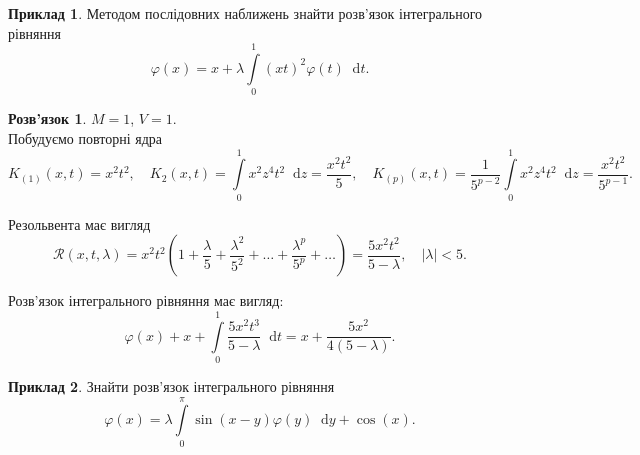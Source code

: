 \documentclass[a4paper, 12pt]{book}
\theoremstyle{definition}
\newtheorem{example}{Приклад}
\newtheorem*{solution*}{Розв'язок}
\newcommand*\diff{\mathop{}\!\mathrm{d}}
\renewcommand{\phi}{\varphi}
\newcommand{\Int}{\displaystyle\int\limits}
\begin{document}
\begin{example}
	Методом послідовних наближень знайти розв’язок інтегрального рівняння \[\phi(x) = x + \lambda \Int_0^1 (xt)^2 \phi(t) \diff t.\]
\end{example}

\begin{solution*}
	$M = 1$, $V = 1$. \\

	Побудуємо повторні ядра \[ K_{(1)}(x, t) = x^2t^2, \quad K_2(x, t) = \Int_0^1 x^2 z^4 t^2 \diff z = \dfrac{x^2t^2}{5}, \quad K_{(p)}(x, t) = \dfrac{1}{5^{p - 2}} \Int_0^1 x^2 z^4 t^2 \diff z = \dfrac{x^2t^2}{5^{p - 1}}. \]
	
	Резольвента має вигляд \[\mathcal{R}(x, t, \lambda) = x^2 t^2 \left(1 + \dfrac{\lambda}{5} + \dfrac{\lambda^2}{5^2} + \ldots + \dfrac{\lambda^p}{5^p} + \ldots \right) = \dfrac{5x^2t^2}{5 - \lambda}, \quad |\lambda| < 5. \]

	Розв’язок інтегрального рівняння має вигляд: \[ \phi(x) + x + \Int_0^1 \dfrac{5x^2t^3}{5 - \lambda} \diff t = x + \dfrac{5x^2}{4(5 - \lambda)}. \]
\end{solution*}

\newpage

\begin{example}
	Знайти розв’язок інтегрального рівняння \[ \phi(x) = \lambda \Int_0^\pi \sin(x - y) \phi(y) \diff y + \cos(x). \]
\end{example}
\end{document}
